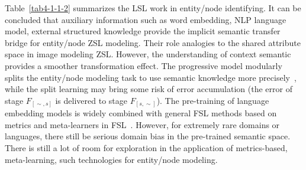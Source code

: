  Table~\ref{tab4-1-1-2} summarizes the LSL work in entity/node identifying. It can be concluded that auxiliary information such as word embedding, NLP language model, external structured knowledge provide the implicit semantic transfer bridge for entity/node ZSL modeling. Their role analogies to the shared attribute space in image modeling ZSL. However, the understanding of context semantic provides a smoother transformation effect. The progressive model modularly splits the entity/node modeling task to use semantic knowledge more precisely~, while the split learning may bring some risk of error accumulation (the error of stage $F_{[\sim, s]}$ is delivered to stage $F_{[s, \sim]}$). The pre-training of language embedding models is widely combined with general FSL methods based on metrics and meta-learners in FSL~. However, for extremely rare domains or languages, there still be serious domain bias in the pre-trained semantic space. There is still a lot of room for exploration in the application of metrics-based, meta-learning, such technologies for entity/node modeling.

